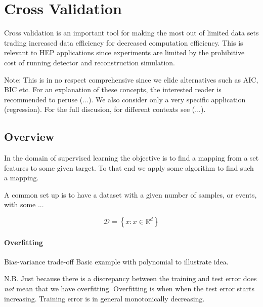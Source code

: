

%
%
%

\section{Cross Validation}
Cross validation is an important tool for making the most out of limited data
sets trading increased data efficiency for decreased computation efficiency.
This is relevant to HEP applications since experiments are limited by the
prohibitive cost of running detector and reconstruction simulation.

Note: This is in no respect comprehensive since we elide alternatives such as
AIC, BIC etc. For an explanation of these concepts, the interested reader is
recommended to peruse (...).
We also consider only a very specific application (regression). For the full
discusion, for different contexts see (...).

\subsection{Overview}

In the domain of supervised learning the objective is to find a mapping from a set features to some given target.
To that end we apply some algorithm to find such a mapping.

A common set up is to have a dataset with a given number of samples, or events, with some ...

\begin{equation}
\mathcal{D} = \left\{x : x \in \mathbb{R}^{d}\right\}
\end{equation}

\paragraph{Overfitting}
Bias-variance trade-off
Basic example with polynomial to illustrate idea.

N.B. Just because there is a discrepancy between the training and test error does \emph{not} mean that we have overfitting. Overfitting is when when the test error starts increasing. Training error is in general monotonically decreasing.

